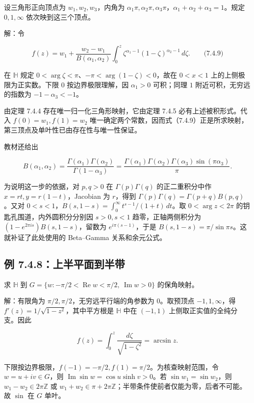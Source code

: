 \documentclass[11pt,a4paper]{article}
\begin{document}
设三角形正向顶点为 \(w_1,w_2,w_3\)，内角为
\(\alpha_1\pi,\alpha_2\pi,\alpha_3\pi\)，\(\alpha_1+\alpha_2+\alpha_3=1\)。规定
\(0,1,\infty\) 依次映到这三个顶点。

解：令

\[
f(z)=w_1+\frac{w_2-w_1}{B(\alpha_1,\alpha_2)}
\int_0^z\zeta^{\alpha_1-1}(1-\zeta)^{\alpha_2-1}\,d\zeta.
\qquad\text{(7.4.9)}
\]

在 \(\mathbb H\) 规定
\(0<\arg\zeta<\pi\)、\(-\pi<\arg(1-\zeta)<0\)，故在 \(0<x<1\)
上的上侧极限为正实数。下限 \(0\) 按边界极限理解，因 \(\alpha_1>0\)
可积；同理 \(1\) 附近可积，无穷远的指数为 \(-1-\alpha_3<-1\)。

由定理 7.4.4 存在唯一归一化三角形映射，它由定理 7.4.5
必有上述被积形式。代入 \(f(0)=w_1,f(1)=w_2\)
唯一确定两个常数，因而式（7.4.9）正是所求映射，第三顶点及单叶性已由存在性与唯一性保证。

教材还给出

\[
B(\alpha_1,\alpha_2)
=\frac{\Gamma(\alpha_1)\Gamma(\alpha_2)}{\Gamma(1-\alpha_3)}
=\frac{\Gamma(\alpha_1)\Gamma(\alpha_2)\Gamma(\alpha_3)\sin(\pi\alpha_3)}\pi.
\]

为说明这一步的依据，对 \(p,q>0\) 在 \(\Gamma(p)\Gamma(q)\)
的正二重积分中作 \(x=rt,y=r(1-t)\)，Jacobian 为 \(r\)，得到
\(\Gamma(p)\Gamma(q)=\Gamma(p+q)B(p,q)\)。又对
\(0<s<1\)，\(B(s,1-s)=\int_0^\infty t^{s-1}/(1+t)\,dt\)。取
\(0<\arg z<2\pi\) 的钥匙孔围道，内外圆积分分别因 \(s>0,s<1\)
趋零，正轴两侧积分为 \((1-e^{2\pi is})B(s,1-s)\)，留数为
\(e^{i\pi(s-1)}\)，于是 \(B(s,1-s)=\pi/\sin\pi s\)。这就补证了此处使用的
Beta--Gamma 关系和余元公式。

\subsection{例 7.4.8：上半平面到半带}\label{ch07-s4-heading-9}

求 \(\mathbb H\) 到
\(G=\{w:-\pi/2<\operatorname{Re}w<\pi/2,\ \operatorname{Im}w>0\}\)
的保角映射。

解：有限角为 \(\pi/2,\pi/2\)，无穷远平行端的角参数为 \(0\)。取预顶点
\(-1,1,\infty\)，得 \(f'(z)=1/\sqrt{1-z^2}\)，其中平方根是 \(\mathbb H\)
中在 \((-1,1)\) 上侧取正实值的全纯分支。因此

\[
f(z)=\int_0^z\frac{d\zeta}{\sqrt{1-\zeta^2}}=\arcsin z.
\]

下限按边界极限，\(f(-1)=-\pi/2,f(1)=\pi/2\)。为核查映射范围，令
\(w=u+iv\in G\)，则 \(\operatorname{Im}\sin w=\cos u\sinh v>0\)。若
\(\sin w_1=\sin w_2\)，则 \(w_1-w_2\in2\pi\mathbb Z\) 或
\(w_1+w_2\in\pi+2\pi\mathbb Z\)；半带条件使前者仅能为零，后者不可能。故
\(\sin\) 在 \(G\) 单叶。
\end{document}
